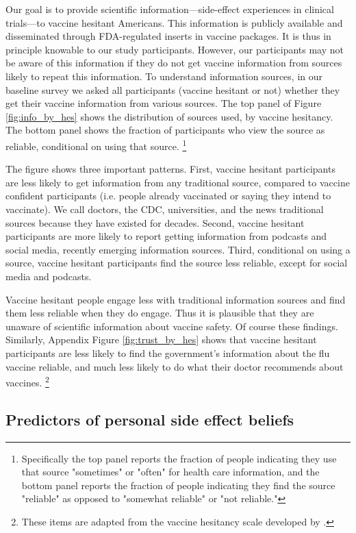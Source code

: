 Our goal is to provide scientific information---side-effect experiences in
clinical trials---to vaccine hesitant Americans. This information is 
publicly available and disseminated through FDA-regulated inserts in vaccine
packages. It is thus in principle knowable to our study participants. 
However, our participants may not be aware of this information if they do not 
get vaccine information from sources likely to repeat this information.
To understand information sources, in our baseline survey we asked all 
participants (vaccine hesitant or not) whether they get their vaccine
information from various sources. The top panel of Figure \ref{fig:info_by_hes} 
shows the distribution of sources used, by vaccine hesitancy.
The bottom panel shows the fraction of participants who view the source
as reliable, conditional on using that source. %
\footnote{Specifically the top panel reports the fraction of people indicating
they use that source "sometimes" or "often" for health care information,
and the bottom panel reports the fraction of people indicating they find
the source "reliable" as opposed to "somewhat reliable" or "not reliable."}

The figure shows three important patterns. First, vaccine hesitant participants 
are less likely to get information from any traditional source, compared to vaccine confident
participants (i.e. people already vaccinated or saying they intend to vaccinate).
We call doctors, the CDC, universities, and the news traditional sources
because they have existed for decades. Second, vaccine hesitant 
participants are more likely to report getting information from 
podcasts and social media, recently emerging information sources. 
Third, conditional on using a source, vaccine hesitant participants find the
source less reliable, except for social media and podcasts.

Vaccine hesitant people engage less with traditional information
sources and find them less reliable when they do engage. 
Thus it is plausible that they are unaware of scientific information about
vaccine safety. Of course these findings.  Similarly, Appendix Figure 
\ref{fig:trust_by_hes} shows 
that vaccine hesitant participants are less likely to find the government's 
information about the flu vaccine reliable, and much less likely to do what their
doctor recommends about vaccines.%
\footnote{These items are adapted from the vaccine hesitancy scale developed
by \citet{larson2015measuring}.} 


\subsection{Predictors of personal side effect beliefs}

